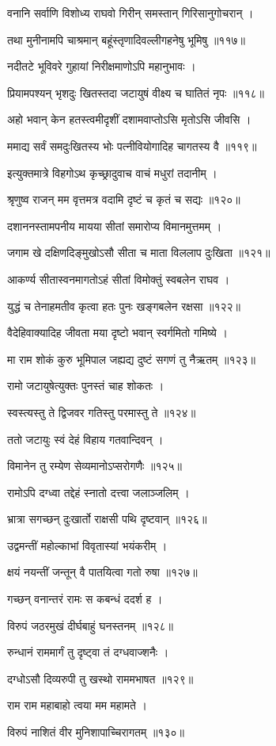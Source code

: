 वनानि सर्वाणि विशोध्य राघवो गिरीन् समस्तान् गिरिसानुगोचरान् ।

तथा मुनीनामपि चाश्रमान् बहूंस्तृणादिवल्लीगहनेषु भूमिषु ॥११७॥

नदीतटे भूविवरे गुहायां निरीक्षमाणोऽपि महानुभावः ।

प्रियामपश्यन् भृशदुः खितस्तदा जटायुषं वीक्ष्य च घातितं नृपः ॥११८॥

अहो भवान् केन हतस्त्वमीदृशीं दशामवाप्तोऽसि मृतोऽसि जीवसि ।

ममाद्य सर्वं समदुःखितस्य भोः पत्नीवियोगादिह चागतस्य वै ॥११९॥

इत्युक्तमात्रे विहगोऽथ कृच्छ्रादुवाच वाचं मधुरां तदानीम् ।

श्रृणुष्व राजन् मम वृत्तमत्र वदामि दृष्टं च कृतं च सद्यः ॥१२०॥

दशाननस्तामपनीय मायया सीतां समारोप्य विमानमुत्तमम् ।

जगाम खे दक्षिणदिङ्मुखोऽसौ सीता च माता विललाप दुःखिता ॥१२१॥

आकर्ण्य सीतास्वनमागतोऽहं सीतां विमोक्तुं स्वबलेन राघव ।

युद्धं च तेनाहमतीव कृत्वा हतः पुनः खङ्गबलेन रक्षसा ॥१२२॥

वैदेहिवाक्यादिह जीवता मया दृष्टो भवान् स्वर्गमितो गमिष्ये ।

मा राम शोकं कुरु भूमिपाल जह्यद्य दुष्टं सगणं तु नैऋतम् ॥१२३॥

रामो जटायुषेत्युक्तः पुनस्तं चाह शोकतः ।

स्वस्त्यस्तु ते द्विजवर गतिस्तु परमास्तु ते ॥१२४॥

ततो जटायुः स्वं देहं विहाय गतवान्दिवन् ।

विमानेन तु रम्येण सेव्यमानोऽप्सरोगणैः ॥१२५॥

रामोऽपि दग्ध्वा तद्देहं स्नातो दत्त्वा जलाञ्जलिम् ।

भ्रात्रा सगच्छन् दुःखार्तो राक्षसी पथि दृष्टवान् ॥१२६॥

उद्वमन्तीं महोल्काभां विवृतास्यां भयंकरीम् ।

क्षयं नयन्तीं जन्तून् वै पातयित्वा गतो रुषा ॥१२७॥

गच्छन् वनान्तरं रामः स कबन्धं ददर्श ह ।

विरुपं जठरमुखं दीर्घबाहुं घनस्तनम् ॥१२८॥

रुन्धानं राममार्गं तु दृष्ट्वा तं दग्धवाज्शनैः ।

दग्धोऽसौ दिव्यरुपी तु खस्थो राममभाषत ॥१२९॥

राम राम महाबाहो त्वया मम महामते ।

विरुपं नाशितं वीर मुनिशापाच्चिरागतम् ॥१३०॥

